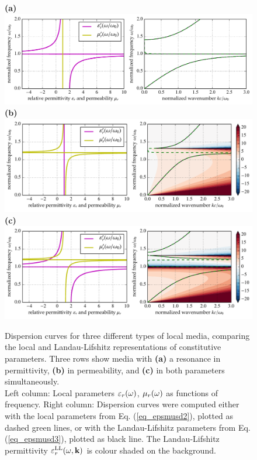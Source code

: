 \begin{figure}[t] \caption{Dispersion curves for three different types of local media, comparing the local and Landau-Lifshitz representations of constitutive parameters. Three rows show media with \textbf{(a)} a  resonance in permittivity, \textbf{(b)} in permeability, and \textbf{(c)} in both parameters simultaneously.\\
Left column: Local parameters $\varepsilon_r(\omega)$, $\mu_r(\omega)$ as functions of frequency. Right column: Dispersion curves were computed either with the local parameters from Eq. (\ref{eq_epsmusd2}), plotted as dashed green lines, or with the Landau-Lifshitz parameters from Eq. (\ref{eq_epsmusd3}), plotted as black line. The Landau-Lifshitz permittivity $\varepsilon_r^\text{LL}(\omega,{\mathbf{k}})$ is colour shaded on the background. %
} \label{fg_dcll} \centering  
\textbf{(a)}\\\includegraphics[width=1\textwidth]{img/dispersion_landau_lifshitz/dispersion_ll_el.pdf}    
\textbf{(b)}\\\includegraphics[width=1\textwidth]{img/dispersion_landau_lifshitz/dispersion_ll_mag.pdf}
\textbf{(c)}\\\includegraphics[width=1\textwidth]{img/dispersion_landau_lifshitz/dispersion_ll_elmag.pdf}
\end{figure}
\clearpage

